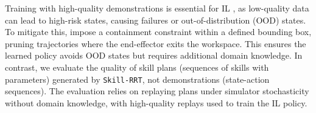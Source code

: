 
Training with high-quality demonstrations is essential for IL \cite{mandlekar2022matters}, as low-quality data can lead to high-risk states, causing failures or out-of-distribution (OOD) states. To mitigate this, \citet{dalal2023imitating} impose a containment constraint within a defined bounding box, pruning trajectories where the end-effector exits the workspace. This ensures the learned policy avoids OOD states but requires additional domain knowledge. In contrast, we evaluate the quality of skill plans (sequences of skills with parameters) generated by \texttt{Skill-RRT}, not demonstrations (state-action sequences). The evaluation relies on replaying plans under simulator stochasticity without domain knowledge, with high-quality replays used to train the IL policy.


